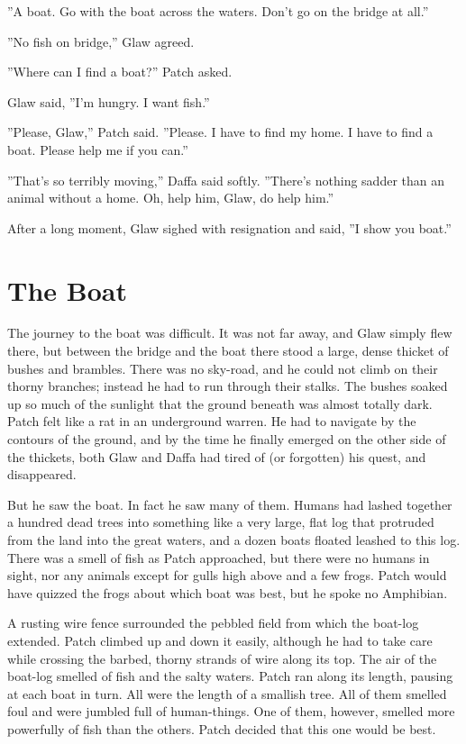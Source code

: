 \documentclass[12pt]{book}
\begin{document}
''A boat. Go with the boat across the waters. Don't go on the bridge at all.''

''No fish on bridge,'' Glaw agreed.

''Where can I find a boat?'' Patch asked.

Glaw said, ''I'm hungry. I want fish.''

''Please, Glaw,'' Patch said. ''Please. I have to find my home. I have to find a boat. Please help me if you can.''

''That's so terribly moving,'' Daffa said softly. ''There's nothing sadder than an animal without a home. Oh, help him, Glaw, do help him.''

After a long moment, Glaw sighed with resignation and said, ''I show you boat.''


\section{The Boat}

The journey to the boat was difficult. It was not far away, and Glaw simply flew there, but between the bridge and the boat there stood a large, dense thicket of bushes and brambles. There was no sky-road, and he could not climb on their thorny branches; instead he had to run through their stalks. The bushes soaked up so much of the sunlight that the ground beneath was almost totally dark. Patch felt like a rat in an underground warren. He had to navigate by the contours of the ground, and by the time he finally emerged on the other side of the thickets, both Glaw and Daffa had tired of (or forgotten) his quest, and disappeared.

But he saw the boat. In fact he saw many of them. Humans had lashed together a hundred dead trees into something like a very large, flat log that protruded from the land into the great waters, and a dozen boats floated leashed to this log. There was a smell of fish as Patch approached, but there were no humans in sight, nor any animals except for gulls high above and a few frogs. Patch would have quizzed the frogs about which boat was best, but he spoke no Amphibian.

A rusting wire fence surrounded the pebbled field from which the boat-log extended. Patch climbed up and down it easily, although he had to take care while crossing the barbed, thorny strands of wire along its top. The air of the boat-log smelled of fish and the salty waters. Patch ran along its length, pausing at each boat in turn. All were the length of a smallish tree. All of them smelled foul and were jumbled full of human-things. One of them, however, smelled more powerfully of fish than the others. Patch decided that this one would be best.
\end{document}
